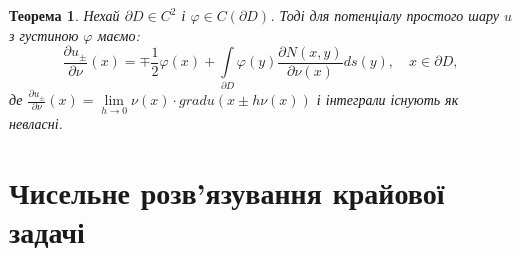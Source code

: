 \documentclass[a4 paper,12pt,ukrainian]{report}
\newtheorem{theorem}{\textbf{Теорема}}[chapter]
\begin{document}
\begin{theorem}
Нехай $\partial D\in C^2$ і $\varphi\in C(\partial D)$. Тоді для потенціалу простого шару $u$ з густиною $\varphi$ маємо:
\begin{equation*}
\frac{\partial u_\pm}{\partial\nu}(x)=\mp\frac{1}{2}\varphi(x)+\int\limits_{\partial D}\varphi(y)\frac{\partial N(x,y)}{\partial\nu(x)} ds(y) , \quad x \in \partial D,
\end{equation*}
де $\frac{\partial u_\pm}{\partial\nu}(x)=\lim\limits_{h \to 0}\nu(x)\cdot gradu(x\pm h\nu(x))$ і інтеграли існують як невласні.
\end{theorem}



\chapter{Чисельне розв'язування крайової задачі}
\end{document}
